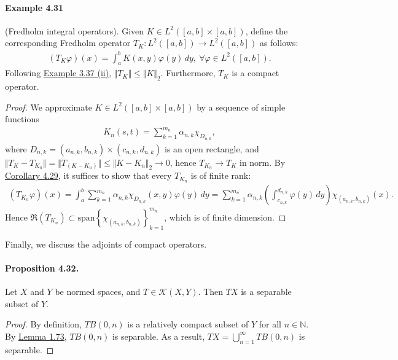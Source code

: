 \documentclass{article}
\begin{document}
\paragraph{Example 4.31\label{example:4.31}} (Fredholm integral operators). Given $K\in L^2([a,b]\times[a,b])$, define the corresponding Fredholm operator $T_K:L^2([a,b])\to L^2([a,b])$ as follows:
\begin{align*}
	(T_K\varphi)(x)=\int_a^b K(x,y)\varphi(y)\,dy,\ \forall \varphi\in L^2([a,b]).
\end{align*}
Following \hyperref[example:3.37]{Example 3.37 (ii)}, $\Vert T_K\Vert\leq\Vert K\Vert_2$. Furthermore, $T_K$ is a compact operator.
\begin{proof}
We approximate $K\in L^2([a,b]\times[a,b])$ by a sequence of simple functions
\begin{align*}
	K_n(s,t) = \sum_{k=1}^{m_n}\alpha_{n,k}\chi_{D_{n,k}},
\end{align*}
where $D_{n,k}=(a_{n,k},b_{n,k})\times(c_{n,k},d_{n,k})$ is an open rectangle, and $\Vert T_K-T_{K_n}\Vert = \Vert T_{(K-K_n)}\Vert\leq\Vert K-K_n\Vert_2\to 0$, hence $T_{K_n}\to T_K$ in norm. By \hyperref[cor:4.29]{Corollary 4.29}, it suffices to show that every $T_{K_n}$ is of finite rank:
\begin{align*}
	(T_{K_n}\varphi)(x) = \int_a^b\sum_{k=1}^{m_n}\alpha_{n,k}\chi_{D_{n,k}}(x,y)\varphi(y)\,dy = \sum_{k=1}^{m_n}\alpha_{n,k}\left(\int_{c_{n,k}}^{d_{n,k}}\varphi(y)\,dy\right)\chi_{(a_{n,k},b_{n,k})}(x).
\end{align*}
Hence $\mathfrak{R}(T_{K_n})\subset\mathrm{span}\left\{\chi_{(a_{n,k},b_{n,k})}\right\}_{k=1}^{m_n}$, which is of finite dimension.
\end{proof}

Finally, we discuss the adjoints of compact operators.
\paragraph{Proposition 4.32.\label{prop:4.32}} Let $X$ and $Y$ be normed spaces, and $T\in\mathcal{K}(X,Y)$. Then $TX$ is a separable subset of $Y$.
\begin{proof}
By definition, $TB(0,n)$ is a relatively compact subset of $Y$ for all $n\in\mathbb{N}$. By \hyperref[lemma:1.73]{Lemma 1.73}, $TB(0,n)$ is separable. As a result, $TX=\bigcup_{n=1}^\infty TB(0,n)$ is separable.
\end{proof}
\end{document}
